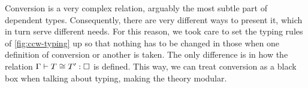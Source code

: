 \begin{figure*}[ht]
  \LastFloat


  \caption{Collected typing rules for }
  \label{fig:ccw-typing}
\end{figure*}

Conversion is a very complex relation, arguably the most subtle part of dependent types.
Consequently, there are very different ways to present it, which in turn serve different
needs.
For this reason, we took care to set the typing rules of
\cref{fig:ccw-typing} up so that nothing has to
be changed in those when one definition of conversion or another is taken. The only
difference is in how the relation $\Gamma \vdash T \conv T' : \uni$ is defined.
This way, we can treat conversion as a black box when talking about typing,
making the theory modular.

